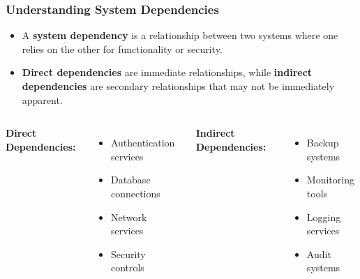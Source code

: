 \documentclass{beamer}
\begin{document}
                \begin{frame}
                \frametitle{Understanding System Dependencies}
                \begin{itemize}
                    \item A \textbf{system dependency} is a relationship between two systems where one relies on the other for functionality or security.
                    \item \textbf{Direct dependencies} are immediate relationships, while \textbf{indirect dependencies} are secondary relationships that may not be immediately apparent.
                \end{itemize}
                \begin{columns}[t]
                
                \textbf{Direct Dependencies:}
                \begin{itemize}
                    \item Authentication services
                    \item Database connections
                    \item Network services
                    \item Security controls
                \end{itemize}
                \textbf{Indirect Dependencies:}
                \begin{itemize}
                    \item Backup systems
                    \item Monitoring tools
                    \item Logging services
                    \item Audit systems
                \end{itemize}
                \end{columns}
                
                \end{frame}
                
\end{document}
